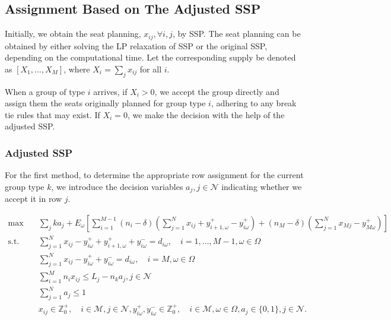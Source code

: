 
\subsection{Assignment Based on The Adjusted SSP}
Initially, we obtain the seat planning, $x_{ij}, \forall i,j$, by SSP. The seat planning can be obtained by either solving the LP relaxation of SSP or the original SSP, depending on the computational time. Let the corresponding supply be denoted as $[X_1, \ldots, X_M]$, where $X_i = \sum_{j} x_{ij}$ for all $i$.

When a group of type $i$ arrives, if $X_i > 0$, we accept the group directly and assign them the seats originally planned for group type $i$, adhering to any break tie rules that may exist. If $X_i = 0$, we make the decision with the help of the adjusted SSP. 

\subsubsection{Adjusted SSP}
For the first method, to determine the appropriate row assignment for the current group type $k$, we introduce the decision variables $a_j, j \in \mathcal{N}$ indicating whether we accept it in row $j$.

\begin{equation}\label{adjusted_SSP}
  \begin{aligned}
  \max \quad & \sum_{j} k a_j + E_{\omega}\left[\sum_{i=1}^{M-1} (n_i-\delta) (\sum_{j= 1}^{N} x_{ij} + y_{i+1,\omega}^{+} - y_{i \omega}^{+}) + (n_{M}-\delta) (\sum_{j= 1}^{N} x_{Mj} - y_{M \omega}^{+})\right] \\
  \text {s.t.} \quad & \sum_{j= 1}^{N} x_{ij}-y_{i \omega}^{+}+
  y_{i+1, \omega}^{+} + y_{i \omega}^{-}=d_{i \omega}, \quad i = 1,\ldots,M-1, \omega \in \Omega \\
  & \sum_{j= 1}^{N} x_{ij} -y_{i \omega}^{+}+y_{i \omega}^{-}=d_{i \omega}, \quad i = M, \omega \in \Omega \\
  & \sum_{i=1}^{M} n_{i} x_{ij} \leq L_j - n_k a_j, j \in \mathcal{N} \\
  & \sum_{j=1}^{N} a_j \leq 1 \\
  & x_{ij} \in \mathbb{Z}_{0}^{+}, \quad i \in \mathcal{M}, j \in \mathcal{N}, y_{i \omega}^{+}, y_{i \omega}^{-} \in \mathbb{Z}_{0}^{+}, \quad i \in \mathcal{M}, \omega \in \Omega,  a_j \in \{0,1\}, j \in \mathcal{N}.
  \end{aligned}
\end{equation}

